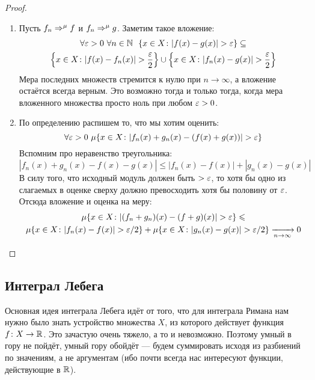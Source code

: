 \begin{proof}~
	\begin{enumerate}
		\item Пусть $f_n \Rightarrow^\mu f$ и $f_n \Rightarrow^\mu g$. Заметим такое вложение:
		\begin{multline*}
			\forall \varepsilon > 0\ \forall n \in \mathbb{N}\ \ \{x \in X \colon |f(x) - g(x)| > \varepsilon\} \subseteq
			\\
			\left\{x \in X \colon |f(x) - f_n(x)| > \frac{\varepsilon}{2}\right\} \cup \left\{x \in X \colon |f_n(x) - g(x)| > \frac{\varepsilon}{2}\right\}
		\end{multline*}
		Мера последних множеств стремится к нулю при $n \to \infty$, а вложение остаётся всегда верным. Это возможно тогда и только тогда, когда мера вложенного множества просто ноль при любом $\varepsilon > 0$.
		
		\item По определению распишем то, что мы хотим оценить:
		\[
			\forall \varepsilon > 0\ \mu\{x \in X \colon |f_n(x) + g_n(x) - (f(x) + g(x))| > \varepsilon\}
		\]
		Вспомним про неравенство треугольника:
		\[
			|f_n(x) + g_n(x) - f(x) - g(x)| \le |f_n(x) - f(x)| + |g_n(x) - g(x)|
		\]
		В силу того, что исходный модуль должен быть $> \varepsilon$, то хотя бы одно из слагаемых в оценке сверху должно превосходить хотя бы половину от $\varepsilon$. Отсюда вложение и оценка на меру:
		\begin{multline*}
			\mu\{x \in X \colon |(f_n + g_n)(x) - (f + g)(x)| > \varepsilon\} \leqslant
			\\
			\mu\{x \in X \colon |f_n(x) - f(x)| > \varepsilon / 2\} + \mu\{x \in X \colon |g_n(x) - g(x)| > \varepsilon / 2\} \xrightarrow[n \to \infty]{} 0
		\end{multline*}
	\end{enumerate}
\end{proof}

\subsection{Интеграл Лебега}

\begin{note}
	Основная идея интеграла Лебега идёт от того, что для интеграла Римана нам нужно было знать устройство множества $X$, из которого действует функция $f \colon X \to \mathbb{R}$. Это зачастую очень тяжело, а то и невозможно. Поэтому умный в гору не пойдёт, умный гору обойдёт --- будем суммировать исходя из разбиений по значениям, а не аргументам (ибо почти всегда нас интересуют функции, действующие в $\mathbb{R}$).
\end{note}

